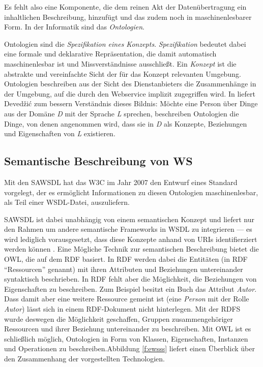 Es fehlt also eine Komponente, die dem reinen Akt der Datenübertragung ein inhaltlichen Beschreibung, hinzufügt und das zudem noch in maschinenlesbarer Form. In der Informatik sind das \emph{Ontologien}.

Ontologien sind die \emph{Spezifikation eines Konzepts}. \emph{Spezifikation} bedeutet dabei eine formale und deklarative Repräsentation, die damit automatisch maschinenlesbar ist und Missverständnisse ausschließt. Ein \emph{Konzept} ist die abstrakte und vereinfachte Sicht der für das Konzept relevanten Umgebung. Ontologien beschreiben aus der Sicht des Dienstanbieters die Zusammenhänge in der Umgebung, auf die durch den Webservice implizit zugegriffen wird. In \cite[S.31]{dcswe} liefert Devedžić zum bessern Verständnis dieses Bildnis: Möchte eine Person über Dinge aus der Domäne \emph{D} mit der Sprache \emph{L} sprechen, beschreiben Ontologien die Dinge, von denen angenommen wird, dass sie in \emph{D} als Konzepte, Beziehungen und Eigenschaften von \emph{L} existieren.

\subsection{Semantische Beschreibung von \acl{WS}}\label{l:sawsdl}

Mit den \ac{SAWSDL} hat das \ac{W3C} im Jahr 2007 den Entwurf eines Standard vorgelegt, der es ermöglicht Informationen zu diesen Ontologien maschinenlesbar, als Teil einer \ac{WSDL}-Datei, auszuliefern. 

\ac{SAWSDL} ist dabei unabhängig von einem semantischen Konzept und liefert nur den Rahmen um andere semantische Frameworks in \ac{WSDL} zu integrieren --- es wird lediglich vorausgesetzt, dass diese Konzepte anhand von URIs identifierziert werden können \cite[S.61]{ky-sawsdl}. Eine Mögliche Technik zur semantischen Beschreibung bietet die \ac{OWL}, die auf dem \ac{RDF} basiert. In \ac{RDF} werden dabei die Entitäten (in \ac{RDF} "`Ressourcen"' genannt) mit ihren Attributen und Beziehungen untereinander syntaktisch beschrieben. In \ac{RDF} fehlt aber die Möglichkeit, die Beziehungen von Eigenschaften zu beschreiben. Zum Beispiel besitzt ein Buch das Attribut \emph{Autor}. Dass damit aber eine weitere Ressource gemeint ist (eine \emph{Person} mit der Rolle \emph{Autor}) lässt sich in einem \ac{RDF}-Dokument nicht hinterlegen. Mit der \ac{RDFS} wurde deswegen die Möglichkeit geschaffen, Gruppen zusammengehöriger Ressourcen und ihrer Beziehung untereinander zu beschreiben. Mit \ac{OWL} ist es schließlich möglich, Ontologien in Form von Klassen, Eigenschaften, Instanzen und Operationen zu beschreiben.Abbildung \ref{f:ewsss} liefert einen Überblick über den Zusammenhang der vorgestellten Technologien.

